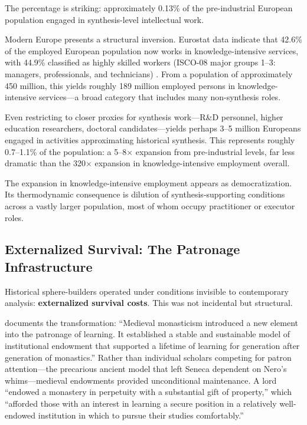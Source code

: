 The percentage is striking: approximately 0.13\% of the pre-industrial European population engaged in synthesis-level intellectual work.

Modern Europe presents a structural inversion. Eurostat data indicate that 42.6\% of the employed European population now works in knowledge-intensive services, with 44.9\% classified as highly skilled workers (ISCO-08 major groups 1--3: managers, professionals, and technicians) \citep{eurostat2024}. From a population of approximately 450 million, this yields roughly 189 million employed persons in knowledge-intensive services---a broad category that includes many non-synthesis roles.

Even restricting to closer proxies for synthesis work---R\&D personnel, higher education researchers, doctoral candidates---yields perhaps 3--5 million Europeans engaged in activities approximating historical synthesis. This represents roughly 0.7--1.1\% of the population: a 5--8$\times$ expansion from pre-industrial levels, far less dramatic than the 320$\times$ expansion in knowledge-intensive employment overall.

The expansion in knowledge-intensive employment appears as democratization. Its thermodynamic consequence is dilution of synthesis-supporting conditions across a vastly larger population, most of whom occupy practitioner or executor roles.

\subsection{Externalized Survival: The Patronage Infrastructure}

Historical sphere-builders operated under conditions invisible to contemporary analysis: \textbf{externalized survival costs}. This was not incidental but structural.

\citet{holzknecht1923} documents the transformation: ``Medieval monasticism introduced a new element into the patronage of learning. It established a stable and sustainable model of institutional endowment that supported a lifetime of learning for generation after generation of monastics.'' Rather than individual scholars competing for patron attention---the precarious ancient model that left Seneca dependent on Nero's whims---medieval endowments provided unconditional maintenance. A lord ``endowed a monastery in perpetuity with a substantial gift of property,'' which ``afforded those with an interest in learning a secure position in a relatively well-endowed institution in which to pursue their studies comfortably.''

